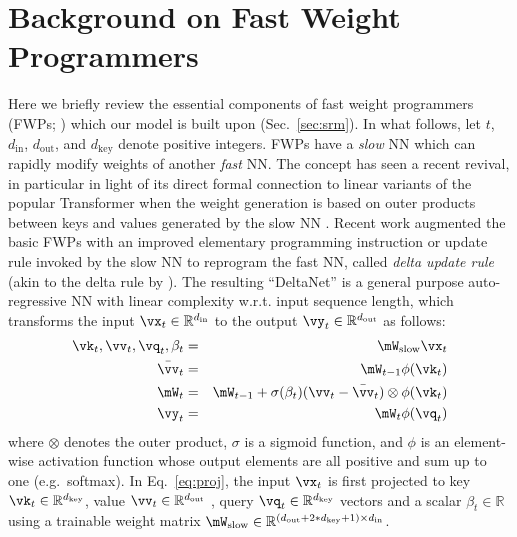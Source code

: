 \documentclass[nohyperref]{article}
\theoremstyle{plain}
\theoremstyle{definition}
\theoremstyle{remark}
\begin{document}
\section{Background on Fast Weight Programmers}
\label{sec:background}
Here we briefly review the essential components
of fast weight programmers (FWPs; \citet{Schmidhuber:91fastweights, schmidhuber1992learning, schmidhuber1993reducing}) which our model is built upon (Sec.~\ref{sec:srm}).
In what follows, let $t$, $d_\text{in}$, $d_\text{out}$, and $d_\text{key}$ denote positive integers.
FWPs have a \textit{slow} NN which can rapidly modify weights of another \textit{fast} NN.
The concept has seen a recent revival, in particular in light of its direct formal connection \citep{schlag2021linear} to linear variants \citep{katharopoulos2020transformers, choromanski2020rethinking, peng2021random, irie2021going} of the popular Transformer \citep{trafo}
when the weight generation is based on outer products between keys and values generated by the slow NN  \citep{Schmidhuber:91fastweights}.
Recent work augmented the basic FWPs \citep{Schmidhuber:91fastweights, schmidhuber1992learning} with an improved elementary programming instruction or update rule invoked by the slow NN to reprogram the fast NN,
called \textit{delta update rule} (akin to the delta rule by \citet{widrow1960adaptive}). The resulting ``DeltaNet'' \citep{schlag2021linear}
is a general purpose auto-regressive NN with linear complexity w.r.t. input sequence length, which transforms
the input $\vx_t \in \mathbb{R}^{d_\text{in}}$ to the output $\vy_t \in \mathbb{R}^{d_\text{out}}$ as follows:
\begin{eqnarray}
\label{eq:proj}
\vk_t, \vv_t, \vq_t, \beta_t &=& \mW_\text{slow}\vx_t\\
\label{eq:retrieve}
\bar{\vv}_t &=& \mW_{t-1} \phi(\vk_t) \\
\label{eq:update}
\mW_t &=& \mW_{t-1} + \sigma(\beta_t)(\vv_t - \bar{\vv}_t) \otimes \phi(\vk_t) \\
\vy_t  &=& \mW_t \phi(\vq_t) \label{eq:fw_get}
\end{eqnarray}
where $\otimes$ denotes the outer product, $\sigma$ is a sigmoid function, and $\phi$ is
an element-wise activation function whose output elements are all positive and sum up to one (e.g.~softmax).
In Eq.~\ref{eq:proj}, the input $\vx_t$ is first projected to
key $\vk_t \in \mathbb{R}^{d_\text{key}}$, value $\vv_t \in \mathbb{R}^{d_\text{out}}$ , query $\vq_t \in \mathbb{R}^{d_\text{key}}$ vectors and a scalar $\beta_t \in \mathbb{R}$
using a trainable weight matrix $\mW_\text{slow} \in \mathbb{R}^{(d_\text{out} + 2 * d_\text{key} + 1) \times d_\text{in}}$.
\end{document}
